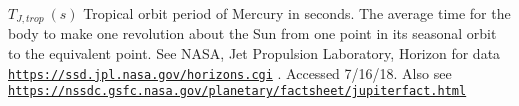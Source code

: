 $ T_{J,trop} \ (s)$ Tropical orbit period of Mercury in seconds. The average time for the body to make one revolution about the Sun from one point in its seasonal orbit to the equivalent point. See N\+A\+SA, Jet Propulsion Laboratory, Horizon for data \href{https://ssd.jpl.nasa.gov/horizons.cgi}{\tt https\+://ssd.\+jpl.\+nasa.\+gov/horizons.\+cgi} . Accessed 7/16/18. Also see \href{https://nssdc.gsfc.nasa.gov/planetary/factsheet/jupiterfact.html}{\tt https\+://nssdc.\+gsfc.\+nasa.\+gov/planetary/factsheet/jupiterfact.\+html} 